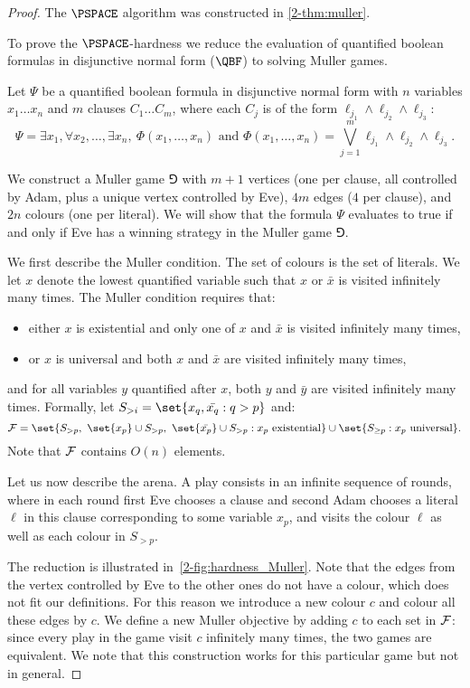\begin{proof}
The $\PSPACE$ algorithm was constructed in \cref{2-thm:muller}.

To prove the $\PSPACE$-hardness we reduce the evaluation of quantified boolean formulas in disjunctive normal form ($\QBF$) to solving Muller games. 

Let $\Psi$ be a quantified boolean formula in disjunctive normal form with $n$ variables $x_1 \ldots x_n$ and $m$ clauses $C_1 \dots C_m$, where each $C_j$ is of the form $\ell_{j_1} \wedge \ell_{j_2} \wedge \ell_{j_3}$:
\[
\Psi = \exists x_1,\forall x_2,\ldots,\exists x_n,\ \Phi(x_1,\dots,x_n) \text{ and } 
\Phi(x_1,\dots,x_n) = \bigvee_{j=1}^m \ell_{j_1} \wedge \ell_{j_2} \wedge \ell_{j_3}.
\]

We construct a Muller game $\Game$ with $m+1$ vertices (one per clause, all controlled by Adam, plus a unique vertex controlled by Eve), $4m$ edges ($4$ per clause), and $2n$ colours (one per literal).
We will show that the formula $\Psi$ evaluates to true if and only if Eve has a winning strategy in the Muller game $\Game$.

We first describe the Muller condition. 
The set of colours is the set of literals.
We let $x$ denote the lowest quantified variable such that $x$ or $\bar{x}$ is visited infinitely many times. 
The Muller condition requires that:
\begin{itemize}
	\item either $x$ is existential and only one of $x$ and $\bar{x}$ is visited infinitely many times,
	\item or $x$ is universal and both $x$ and $\bar{x}$ are visited infinitely many times,
\end{itemize}
and for all variables $y$ quantified after $x$, both $y$ and $\bar{y}$ are visited infinitely many times.
Formally, let $S_{> i} = \set{x_q, \bar{x_q} : q > p}$ and:
\[
\F = \set{ S_{> p},\ \set{x_p} \cup S_{> p},\ \set{\bar{x_p}} \cup S_{> p} : x_p \text{ existential}} \cup \set{ S_{\ge p} : x_p \text{ universal}}.
\]
Note that $\mathcal{F}$ contains $O(n)$ elements.

Let us now describe the arena. A play consists in an infinite sequence of rounds, where in each round first Eve chooses
a clause and second Adam chooses a literal $\ell$ in this clause corresponding to some variable $x_p$, 
and visits the colour $\ell$ as well as each colour in $S_{> p}$.

The reduction is illustrated in~\cref{2-fig:hardness_Muller}.
Note that the edges from the vertex controlled by Eve to the other ones do not have a colour,
which does not fit our definitions.
For this reason we introduce a new colour $c$ and colour all these edges by $c$.
We define a new Muller objective by adding $c$ to each set in $\mathcal{F}$: 
since every play in the game visit $c$ infinitely many times, the two games are equivalent.
We note that this construction works for this particular game but not in general.


\end{proof}
